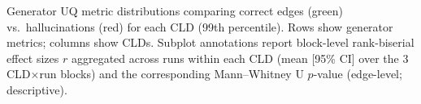 \caption[UQ metric distributions by CLD]{Generator UQ metric distributions comparing correct edges (green) vs.\ hallucinations (red) for each CLD (99th percentile). Rows show generator metrics; columns show CLDs. Subplot annotations report block-level rank-biserial effect sizes $r$ aggregated across runs within each CLD (mean [95\% CI] over the 3 CLD$\times$run blocks) and the corresponding Mann--Whitney U $p$-value (edge-level; descriptive).}
\label{fig:rq2_distributions_by_cld}